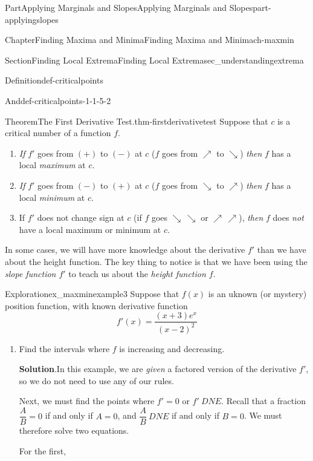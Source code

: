 \documentclass{tufte-book}
\newcommand{\blocktitlefont}{\relax}
\numberwithin{equation}{chapter}
\begin{document}
\begin{partptx}{Part}{Applying Marginals and Slopes}{}{Applying Marginals and Slopes}{}{}{part-applyingslopes}
\begin{chapterptx}{Chapter}{Finding Maxima and Minima}{}{Finding Maxima and Minima}{}{}{ch-maxmin}
\begin{sectionptx}{Section}{Finding Local Extrema}{}{Finding Local Extrema}{}{}{sec_understandingextrema}
\begin{definition}{Definition}{}{def-criticalpoints}
\begin{descriptionlist}
\begin{dlimedium}{And}{def-criticalpoints-1-1-5-2}
%
\end{dlimedium}%
\end{descriptionlist}
%
\end{definition}
\begin{theorem}{Theorem}{The First Derivative Test.}{}{thm-firstderivativetest}%
Suppose that \(c\) is a critical number of a function \(f\).%
%
\begin{enumerate}
\item{}\emph{If} \(f'\) goes from \((+)\) to \((-)\) at \(c\) (\(f\) goes from \(\nearrow\) to \(\searrow\)) \emph{then} \(f\) has a local \emph{maximum} at \(c\).%
\item{}\emph{If} \(f'\) goes from \((-)\) to \((+)\) at \(c\) (\(f\) goes from \(\searrow\) to \(\nearrow\)) \emph{then} \(f\) has a local \emph{minimum} at \(c\).%
\item{}If \(f'\) does not change sign at \(c\) (if \(f\) goes \(\searrow\,\searrow\) or \(\nearrow\,\nearrow\)), \emph{then} \(f\) does \emph{not} have a local maximum or minimum at \(c\).%
\end{enumerate}
\end{theorem}
In some cases, we will have more knowledge about the derivative \(f'\) than we have about the height function. The key thing to notice is that we have been using the \emph{slope function \(f'\)} to teach us about the \emph{height function \(f\)}.%
\begin{exploration}{Exploration}{}{ex_maxminexample3}%
Suppose that \(f(x)\) is an uknown (or mystery) position function, with known derivative function%
\begin{equation*}
f'(x) = \dfrac{(x+3)e^x}{(x-2)^2}
\end{equation*}
%
\begin{enumerate}[font=\bfseries,label=(\alph*),ref=\alph*]%
\item{}Find the intervals where \(f\) is increasing and decreasing.%
\par\smallskip%
\noindent\textbf{\blocktitlefont Solution}.\hypertarget{ex_maxminexample3-2-2}{}\quad{}In this example, we are \emph{given} a factored version of the derivative \(f'\), so we do not need to use any of our rules.%
\par
Next, we must find the points where \(f'=0\) or \(f'\ DNE\).  Recall that a fraction \(\dfrac{A}{B}=0\) if and only if \(A=0\), and \(\dfrac{A}{B}\ DNE\) if and only if \(B=0\).  We must therefore solve two equations.%
\par
For the first,%
\begin{align*}

\end{align*}
\end{enumerate}
\end{exploration}
\end{sectionptx}
\end{chapterptx}
\end{partptx}
\end{document}
